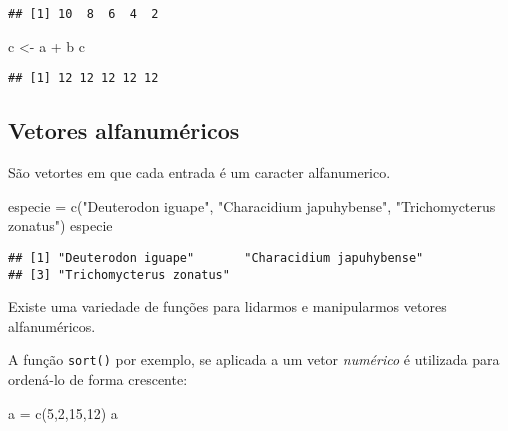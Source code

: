 \documentclass[
]{book}
\newenvironment{Shaded}{\begin{snugshade}}{\end{snugshade}}
\newcommand{\DecValTok}[1]{\textcolor[rgb]{0.00,0.00,0.81}{#1}}
\newcommand{\FunctionTok}[1]{\textcolor[rgb]{0.00,0.00,0.00}{#1}}
\newcommand{\NormalTok}[1]{#1}
\newcommand{\OtherTok}[1]{\textcolor[rgb]{0.56,0.35,0.01}{#1}}
\newcommand{\SpecialCharTok}[1]{\textcolor[rgb]{0.00,0.00,0.00}{#1}}
\newcommand{\StringTok}[1]{\textcolor[rgb]{0.31,0.60,0.02}{#1}}
\begin{document}
\begin{verbatim}
## [1] 10  8  6  4  2
\end{verbatim}

\begin{Shaded}
\begin{Highlighting}[]
\NormalTok{c }\OtherTok{\textless{}{-}}\NormalTok{ a }\SpecialCharTok{+}\NormalTok{ b}
\NormalTok{c}
\end{Highlighting}
\end{Shaded}

\begin{verbatim}
## [1] 12 12 12 12 12
\end{verbatim}

\hypertarget{vetores-alfanumuxe9ricos}{%
\subsection{Vetores alfanuméricos}\label{vetores-alfanumuxe9ricos}}

São vetortes em que cada entrada é um caracter alfanumerico.

\begin{Shaded}
\begin{Highlighting}[]
\NormalTok{especie }\OtherTok{=} \FunctionTok{c}\NormalTok{(}\StringTok{"Deuterodon iguape"}\NormalTok{, }
            \StringTok{"Characidium japuhybense"}\NormalTok{, }
            \StringTok{"Trichomycterus zonatus"}\NormalTok{)}
\NormalTok{especie}
\end{Highlighting}
\end{Shaded}

\begin{verbatim}
## [1] "Deuterodon iguape"       "Characidium japuhybense"
## [3] "Trichomycterus zonatus"
\end{verbatim}

Existe uma variedade de funções para lidarmos e manipularmos vetores alfanuméricos.

A função \texttt{sort()} por exemplo, se aplicada a um vetor \emph{numérico} é utilizada para ordená-lo de forma crescente:

\begin{Shaded}
\begin{Highlighting}[]
\NormalTok{a }\OtherTok{=} \FunctionTok{c}\NormalTok{(}\DecValTok{5}\NormalTok{,}\DecValTok{2}\NormalTok{,}\DecValTok{15}\NormalTok{,}\DecValTok{12}\NormalTok{)}
\NormalTok{a}
\end{Highlighting}
\end{Shaded}
\end{document}

